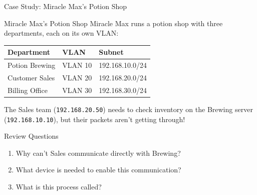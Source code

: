 \documentclass[aspectratio=169]{beamer}  %
\begin{document}
\begin{frame}{Case Study: Miracle Max's Potion Shop}
    \begin{casestudy}{Miracle Max's Potion Shop}
        \small
        Miracle Max runs a potion shop with three departments, each on its own VLAN:
        
        \vspace{0.2em}
        \footnotesize
        \begin{center}
            \begin{tabular}{l l l}
                \toprule
                \textbf{Department} & \textbf{VLAN} & \textbf{Subnet} \\
                \midrule
                Potion Brewing & VLAN 10 & 192.168.10.0/24 \\
                Customer Sales & VLAN 20 & 192.168.20.0/24 \\
                Billing Office & VLAN 30 & 192.168.30.0/24 \\
                \bottomrule
            \end{tabular}
        \end{center}
        
        \vspace{0.2em}
        \small
        The Sales team (\texttt{192.168.20.50}) needs to check inventory on the Brewing server (\texttt{192.168.10.10}), but their packets aren't getting through!
    \end{casestudy}
    
    \begin{block}{Review Questions}
        \small
        \begin{enumerate}\setlength{\itemsep}{1pt}
            \item Why can't Sales communicate directly with Brewing?
            \item What device is needed to enable this communication?
            \item What is this process called?
        \end{enumerate}
    \end{block}
\end{frame}
\end{document}
